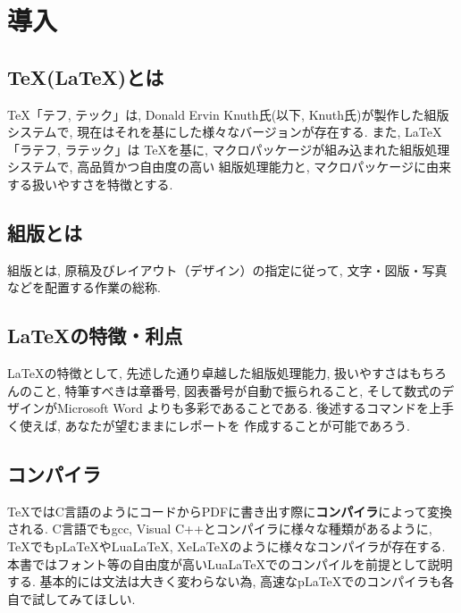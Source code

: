 \section{導入}
\subsection{\TeX(\LaTeX)とは}
\TeX 「テフ, テック」は, Donald Ervin Knuth氏(以下, Knuth氏)が製作した組版システム\cite{W3C2021}で, 
現在はそれを基にした様々なバージョンが存在する. また, \LaTeX 「ラテフ, ラテック」は
\TeX を基に, マクロパッケージが組み込まれた組版処理システムで, 高品質かつ自由度の高い
組版処理能力と, マクロパッケージに由来する扱いやすさを特徴とする. 
\subsection{組版とは}
組版とは, 原稿及びレイアウト（デザイン）の指定に従って, 文字・図版・写真などを配置する作業の総称. 
\subsection{\LaTeX の特徴・利点}
\LaTeX の特徴として, 先述した通り卓越した組版処理能力, 扱いやすさはもちろんのこと, 
特筆すべきは章番号, 図表番号が自動で振られること, そして数式のデザインがMicrosoft Word
よりも多彩であることである. 後述するコマンドを上手く使えば, あなたが望むままにレポートを
作成することが可能であろう. 
\subsection{コンパイラ}
\TeX ではC言語のようにコードからPDFに書き出す際に\textbf{コンパイラ}によって変換される. 
C言語でもgcc, Visual C++とコンパイラに様々な種類があるように, \TeX でもpLaTeXやLuaLaTeX, 
XeLaTeXのように様々なコンパイラが存在する. 
本書ではフォント等の自由度が高いLuaLaTeXでのコンパイルを前提として説明する. 
基本的には文法は大きく変わらない為, 高速なpLaTeXでのコンパイラも各自で試してみてほしい. 